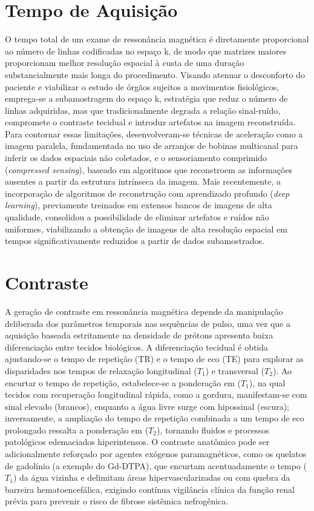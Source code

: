 \documentclass[a4paper,12pt,oneside,openright]{abntex2}
\begin{document}
\section{Tempo de Aquisição}

O tempo total de um exame de ressonância magnética é diretamente proporcional ao número de linhas codificadas no espaço k, de modo que matrizes maiores proporcionam melhor resolução espacial à custa de uma duração substancialmente mais longa do procedimento. Visando atenuar o desconforto do paciente e viabilizar o estudo de órgãos sujeitos a movimentos fisiológicos, emprega-se a subamostragem do espaço k, estratégia que reduz o número de linhas adquiridas, mas que tradicionalmente degrada a relação sinal-ruído, compromete o contraste tecidual e introduz artefatos na imagem reconstruída. Para contornar essas limitações, desenvolveram-se técnicas de aceleração como a imagem paralela, fundamentada no uso de arranjos de bobinas multicanal para inferir os dados espaciais não coletados, e o sensoriamento comprimido (\textit{compressed sensing}), baseado em algoritmos que reconstroem as informações ausentes a partir da estrutura intrínseca da imagem. Mais recentemente, a incorporação de algoritmos de reconstrução com aprendizado profundo (\textit{deep learning}), previamente treinados em extensos bancos de imagens de alta qualidade, consolidou a possibilidade de eliminar artefatos e ruídos não uniformes, viabilizando a obtenção de imagens de alta resolução espacial em tempos significativamente reduzidos a partir de dados subamostrados.

\section{Contraste}

A geração de contraste em ressonância magnética depende da manipulação deliberada dos parâmetros temporais nas sequências de pulso, uma vez que a aquisição baseada estritamente na densidade de prótons apresenta baixa diferenciação entre tecidos biológicos. A diferenciação tecidual é obtida ajustando-se o tempo de repetição (TR) e o tempo de eco (TE) para explorar as disparidades nos tempos de relaxação longitudinal ($T_1$) e transversal ($T_2$). Ao encurtar o tempo de repetição, estabelece-se a ponderação em ($T_1$), na qual tecidos com recuperação longitudinal rápida, como a gordura, manifestam-se com sinal elevado (brancos), enquanto a água livre surge com hipossinal (escura); inversamente, a ampliação do tempo de repetição combinada a um tempo de eco prolongado ressalta a ponderação em ($T_2$), tornando fluidos e processos patológicos edemaciados hiperintensos. O contraste anatômico pode ser adicionalmente reforçado por agentes exógenos paramagnéticos, como os quelatos de gadolínio (a exemplo do Gd-DTPA), que encurtam acentuadamente o tempo ($T_1$) da água vizinha e delimitam áreas hipervascularizadas ou com quebra da barreira hematoencefálica, exigindo contínua vigilância clínica da função renal prévia para prevenir o risco de fibrose sistêmica nefrogênica.
\end{document}
